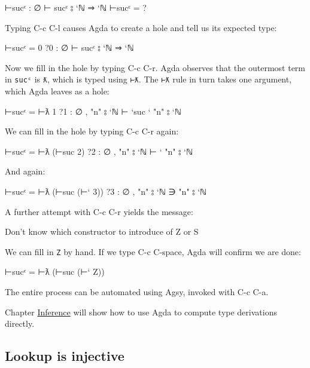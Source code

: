\begin{myDisplay}
⊢sucᶜ : ∅ ⊢ sucᶜ ⦂ `ℕ ⇒ `ℕ
⊢sucᶜ = ?
\end{myDisplay}

Typing C-c C-l causes Agda to create a hole and tell us its expected
type:

\begin{myDisplay}
⊢sucᶜ = { }0
?0 : ∅ ⊢ sucᶜ ⦂ `ℕ ⇒ `ℕ
\end{myDisplay}

Now we fill in the hole by typing C-c C-r. Agda observes that the
outermost term in \texttt{sucᶜ} is \texttt{ƛ}, which is typed using
\texttt{⊢ƛ}. The \texttt{⊢ƛ} rule in turn takes one argument, which Agda
leaves as a hole:

\begin{myDisplay}
⊢sucᶜ = ⊢ƛ { }1
?1 : ∅ , "n" ⦂ `ℕ ⊢ `suc ` "n" ⦂ `ℕ
\end{myDisplay}

We can fill in the hole by typing C-c C-r again:

\begin{myDisplay}
⊢sucᶜ = ⊢ƛ (⊢suc { }2)
?2 : ∅ , "n" ⦂ `ℕ ⊢ ` "n" ⦂ `ℕ
\end{myDisplay}

And again:

\begin{myDisplay}
⊢sucᶜ = ⊢ƛ (⊢suc (⊢` { }3))
?3 : ∅ , "n" ⦂ `ℕ ∋ "n" ⦂ `ℕ
\end{myDisplay}

A further attempt with C-c C-r yields the message:

\begin{myDisplay}
Don't know which constructor to introduce of Z or S
\end{myDisplay}

We can fill in \texttt{Z} by hand. If we type C-c C-space, Agda will
confirm we are done:

\begin{myDisplay}
⊢sucᶜ = ⊢ƛ (⊢suc (⊢` Z))
\end{myDisplay}

The entire process can be automated using Agsy, invoked with C-c C-a.

Chapter \protect\hyperlink{Inference}{Inference} will show how to use
Agda to compute type derivations directly.

\hypertarget{lookup-is-injective}{%
\subsection{Lookup is injective}\label{lookup-is-injective}}

